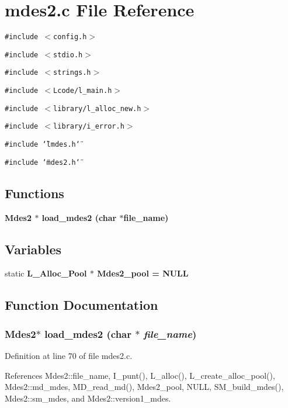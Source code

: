 \section{mdes2.c File Reference}
\label{mdes2_8c}
{\tt \#include $<$config.h$>$}\par
{\tt \#include $<$stdio.h$>$}\par
{\tt \#include $<$strings.h$>$}\par
{\tt \#include $<$Lcode/l\_\-main.h$>$}\par
{\tt \#include $<$library/l\_\-alloc\_\-new.h$>$}\par
{\tt \#include $<$library/i\_\-error.h$>$}\par
{\tt \#include \char`\"{}lmdes.h\char`\"{}}\par
{\tt \#include \char`\"{}mdes2.h\char`\"{}}\par
\subsection*{Functions}
\begin{CompactItemize}
\item 
\bf{Mdes2} $\ast$ \bf{load\_\-mdes2} (char $\ast$file\_\-name)
\end{CompactItemize}
\subsection*{Variables}
\begin{CompactItemize}
\item 
static \bf{L\_\-Alloc\_\-Pool} $\ast$ \bf{Mdes2\_\-pool} = \bf{NULL}
\end{CompactItemize}


\subsection{Function Documentation}
\subsubsection{\setlength{\rightskip}{0pt plus 5cm}\bf{Mdes2}$\ast$ load\_\-mdes2 (char $\ast$ {\em file\_\-name})}\label{mdes2_8c_a5240a35f7d58785ab2ff7b53a348154}




Definition at line 70 of file mdes2.c.

References Mdes2::file\_\-name, I\_\-punt(), L\_\-alloc(), L\_\-create\_\-alloc\_\-pool(), Mdes2::md\_\-mdes, MD\_\-read\_\-md(), Mdes2\_\-pool, NULL, SM\_\-build\_\-mdes(), Mdes2::sm\_\-mdes, and Mdes2::version1\_\-mdes.

